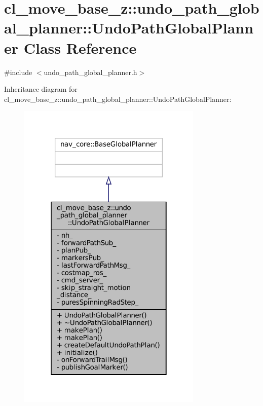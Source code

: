 \hypertarget{classcl__move__base__z_1_1undo__path__global__planner_1_1UndoPathGlobalPlanner}{}\section{cl\+\_\+move\+\_\+base\+\_\+z\+:\+:undo\+\_\+path\+\_\+global\+\_\+planner\+:\+:Undo\+Path\+Global\+Planner Class Reference}
\label{classcl__move__base__z_1_1undo__path__global__planner_1_1UndoPathGlobalPlanner}


{\ttfamily \#include $<$undo\+\_\+path\+\_\+global\+\_\+planner.\+h$>$}



Inheritance diagram for cl\+\_\+move\+\_\+base\+\_\+z\+:\+:undo\+\_\+path\+\_\+global\+\_\+planner\+:\+:Undo\+Path\+Global\+Planner\+:
\nopagebreak
\begin{figure}[H]
\begin{center}
\leavevmode
\includegraphics[width=250pt]{classcl__move__base__z_1_1undo__path__global__planner_1_1UndoPathGlobalPlanner__inherit__graph}
\end{center}
\end{figure}


